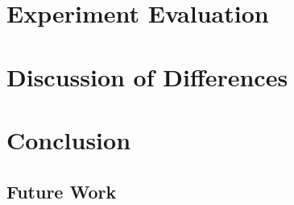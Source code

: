\documentclass[letterpaper]{article}%
\begin{document}
\section{Experiment Evaluation}

\section{Discussion of Differences}

\section{Conclusion}

\subsection{Future Work}

\clearpage
\onecolumn
\end{document}
